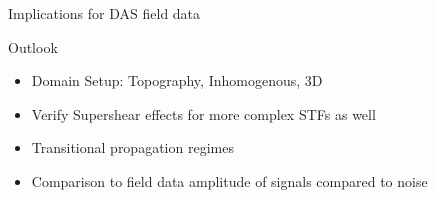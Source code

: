 \documentclass[11pt,aspectratio=169]{beamer}
\begin{document}
\begin{frame}{Implications for DAS field data}
\begin{figure}[H]
{%
}
\label{fig:das_identification}
\end{figure}
    

    
\end{frame}

\begin{frame}{Outlook}
    \begin{itemize}
        \item Domain Setup: Topography, Inhomogenous, 3D
        \item Verify Supershear effects for more complex STFs as well
        \item Transitional propagation regimes
        \item Comparison to field data \rightarrow amplitude of signals compared to noise
    \end{itemize}
    
\end{frame}
\end{document}
